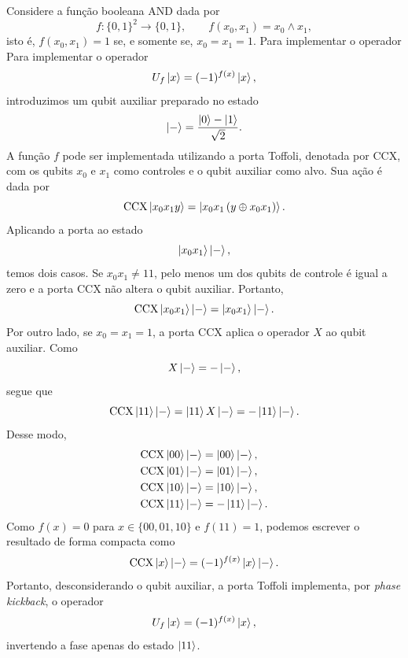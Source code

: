 \begin{example}\label{ex:opkb}
Considere a função booleana $\mathrm{AND}$ dada por
\begin{equation}
    f:\{0,1\}^2\longrightarrow\{0,1\},
    \qquad
    f(x_0,x_1)=x_0 \wedge x_1,
\end{equation}
isto é, $f(x_0,x_1)=1$ se, e somente se, $x_0=x_1=1$. Para implementar o operador
Para implementar o operador
$$
    U_f\ket{x}=(-1)^{f(x)}\ket{x},
$$
introduzimos um qubit auxiliar preparado no estado
$$
    \ket{-}
    =
    \frac{\ket{0}-\ket{1}}{\sqrt{2}}.
$$
A função $f$ pode ser implementada utilizando a porta
Toffoli, denotada por $\mathrm{CCX}$, com os qubits $x_0$ e $x_1$
como controles e o qubit auxiliar como alvo. Sua ação é dada por
$$
    \mathrm{CCX}\ket{x_0x_1y}
    =
    \ket{x_0x_1\left(y\oplus x_0x_1\right)}.
$$
Aplicando a porta ao estado
$$
    \ket{x_0x_1}\ket{-},
$$
temos dois casos. Se $x_0x_1\neq 11$, pelo menos um dos qubits de
controle é igual a zero e a porta $\mathrm{CCX}$ não altera o qubit
auxiliar. Portanto,
$$
    \mathrm{CCX}\ket{x_0x_1}\ket{-}
    =
    \ket{x_0x_1}\ket{-}.
$$
Por outro lado, se $x_0=x_1=1$, a porta $\mathrm{CCX}$ aplica o
operador $X$ ao qubit auxiliar. Como
$$
    X\ket{-}=-\ket{-},
$$
segue que
$$
    \mathrm{CCX}\ket{11}\ket{-}
    =
    \ket{11}X\ket{-}
    =
    -\ket{11}\ket{-}.
$$
Desse modo,
$$
\begin{aligned}
    \mathrm{CCX}\ket{00}\ket{-}
        &= \ket{00}\ket{-},\\
    \mathrm{CCX}\ket{01}\ket{-}
        &= \ket{01}\ket{-},\\
    \mathrm{CCX}\ket{10}\ket{-}
        &= \ket{10}\ket{-},\\
    \mathrm{CCX}\ket{11}\ket{-}
        &= -\ket{11}\ket{-}.
\end{aligned}
$$
Como $f(x)=0$ para $x\in\{00,01,10\}$ e $f(11)=1$, podemos escrever
o resultado de forma compacta como
$$
    \mathrm{CCX}\ket{x}\ket{-}
    =
    (-1)^{f(x)}\ket{x}\ket{-}.
$$
Portanto, desconsiderando o qubit auxiliar, a porta Toffoli implementa,
por \textit{phase kickback}, o operador
$$
    U_f\ket{x}=(-1)^{f(x)}\ket{x},
$$
invertendo a fase apenas do estado $\ket{11}$.
\end{example}


